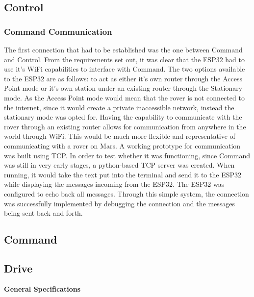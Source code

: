 \documentclass[a4paper]{article}
\begin{document}
\subsection{Control}

\subsubsection{Command Communication}

The first connection that had to be established was the one between Command 
and Control. From the requirements set out, it was clear that the ESP32 
had to use it’s WiFi capabilities to interface with Command. The two 
options available to the ESP32 are as follows: to act as either it's own 
router through the Access Point mode or it's own station under an existing 
router through the Stationary mode. As the Access Point mode would mean 
that the rover is not connected to the internet, since it would create a 
private inaccessible network, instead the stationary mode was opted for. 
Having the capability to communicate with the rover through an existing 
router allows for communication from anywhere in the world through WiFi. 
This would be much more flexible and representative of communicating with 
a rover on Mars. A working prototype for communication was built using 
TCP. In order to test whether it was functioning, since Command was still 
in very early stages, a python-based TCP server was created. When running, 
it would take the text put into the terminal and send it to the ESP32 
while displaying the messages incoming from the ESP32. The ESP32 was 
configured to echo back all messages. Through this simple system, the 
connection was successfully implemented by debugging the connection and 
the messages being sent back and forth.

\subsection{Command}

\subsection{Drive}

\textbf{General Specifications}
\end{document}
